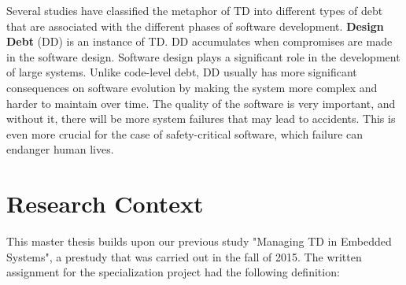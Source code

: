 Several studies have classified the metaphor of TD into different types of debt that are associated with the different phases of software development\cite{li2015systematic,p8-codabux,foser076-brown,tom2013exploration,Zazworka:2011:PDD:1985362.1985372,Zazworka:2013:CSE:2460999.2461005}. \textbf{Design Debt} (DD) is an instance of TD. DD accumulates when compromises are made in the software design. Software design plays a significant role in the development of large systems\cite{krutchen}. Unlike code-level debt, DD usually has more significant consequences on software evolution by making the system more complex and harder to maintain over time\cite{mo2013mapping,izurieta2007software}. The quality of the software is very important, and without it, there will be more system failures that may lead to accidents. This is even more crucial for the case of safety-critical software, which failure can endanger human lives.










\section{Research Context}
This master thesis builds upon our previous study "Managing TD in Embedded Systems"\cite{forprosjekt}, a prestudy that was carried out in the fall of 2015. The written assignment for the specialization project had the following definition:

